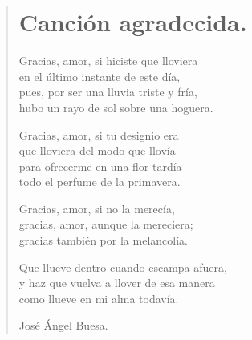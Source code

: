 \documentclass[11pt, portrait, twoside, notitlepage, openright]{book}
\begin{document}
\newpage
\begin{verse}
\begin{center}
\section{Canción agradecida.}
\end{center}
Gracias, amor, si hiciste que lloviera\\
en el último instante de este día,\\
pues, por ser una lluvia triste y fría,\\
hubo un rayo de sol sobre una hoguera.
\newline

Gracias, amor, si tu designio era\\
que lloviera del modo que llovía\\
para ofrecerme en una flor tardía\\
todo el perfume de la primavera.
\newline

Gracias, amor, si no la merecía,\\
gracias, amor, aunque la mereciera;\\
gracias también por la melancolía.
\newline

Que llueve dentro cuando escampa afuera,\\
y haz que vuelva a llover de esa manera\\
como llueve en mi alma todavía.
\newline

José Ángel Buesa.
\end{verse}
\end{document}
